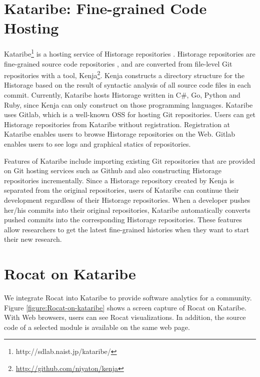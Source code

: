 \documentclass[conference]{IEEEtran}
\newcommand{\figref}[1]{Figure \ref{#1}}
\begin{document}
\section{Kataribe: Fine-grained Code Hosting}
\textsf{Kataribe}\footnote{http://sdlab.naist.jp/kataribe/} is a hosting service of \textsf{Historage} repositories \cite{Fujiwara:2014:KHS:2597073.2597125}.
\textsf{Historage} repositories are fine-grained source code repositories \cite{Hata:2011:HFV:2024445.2024463}, and are converted from file-level Git repositories with a tool, \textsf{Kenja}\footnote{\url{http://github.com/niyaton/kenja}}.
\textsf{Kenja} constructs a directory structure for the \textsf{Historage} based on the result of syntactic analysis of all source code files in each commit.
Currently, \textsf{Kataribe} hosts \textsf{Historage} written in C\#, Go, Python and Ruby, since \textsf{Kenja} can only construct on those programming languages.
\textsf{Kataribe} uses \textsf{Gitlab}, which is a well-known OSS for hosting Git repositories.
Users can get \textsf{Historage} repositories from \textsf{Kataribe} without registration.
Registration at \textsf{Kataribe} enables users to browse \textsf{Historage} repositories on the Web.
\textsf{Gitlab} enables users to see logs and graphical statics of repositories.

Features of \textsf{Kataribe} include importing existing Git repositories that are provided on Git hosting services such as \textsf{Github} and also constructing \textsf{Historage} repositories incrementally.
Since a \textsf{Historage} repository created by \textsf{Kenja} is separated from the original repositories, users of \textsf{Kataribe} can continue their development regardless of their \textsf{Historage} repositories.
When a developer pushes her/his commits into their original repositories, \textsf{Kataribe} automatically converts pushed commits into the corresponding \textsf{Historage} repositories.
These features allow researchers to get the latest fine-grained histories when they want to start their new research.


\section{Rocat on Kataribe}
We integrate \textsf{Rocat} into \textsf{Kataribe} to provide software analytics for a community. 
\figref{figure:Rocat-on-kataribe} shows a screen capture of \textsf{Rocat} on \textsf{Kataribe}.
With Web browsers, users can see \textsf{Rocat} visualizations. 
In addition, the source code of a selected module is available on the same web page.
\end{document}
